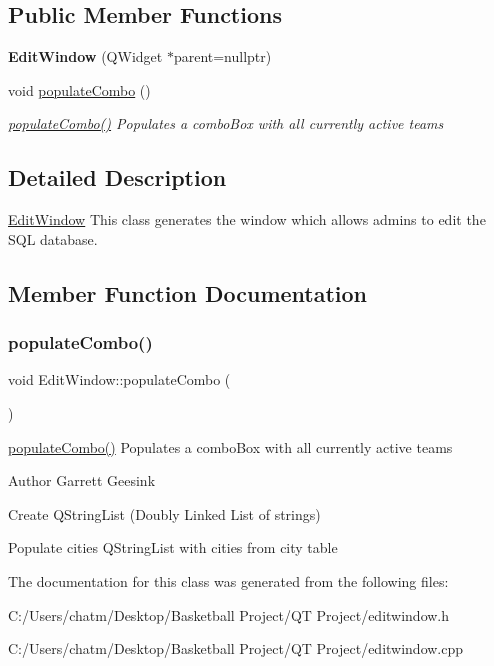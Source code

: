 \subsection*{Public Member Functions}
\begin{DoxyCompactItemize}
\item 
\mbox{\label{class_edit_window_a39a89944c117acac0419345f0a557528}} 
{\bfseries Edit\+Window} (Q\+Widget $\ast$parent=nullptr)
\item 
void \mbox{\hyperlink{class_edit_window_aec9c1fc6cf47cecb28a172b51fad2027}{populate\+Combo}} ()
\begin{DoxyCompactList}\small\item\em \mbox{\hyperlink{class_edit_window_aec9c1fc6cf47cecb28a172b51fad2027}{populate\+Combo()}} Populates a combo\+Box with all currently active teams \end{DoxyCompactList}\end{DoxyCompactItemize}


\subsection{Detailed Description}
\mbox{\hyperlink{class_edit_window}{Edit\+Window}} This class generates the window which allows admins to edit the S\+QL database. 

\subsection{Member Function Documentation}
\mbox{\label{class_edit_window_aec9c1fc6cf47cecb28a172b51fad2027}} 
\subsubsection{\texorpdfstring{populateCombo()}{populateCombo()}}
{\footnotesize\ttfamily void Edit\+Window\+::populate\+Combo (\begin{DoxyParamCaption}{ }\end{DoxyParamCaption})}



\mbox{\hyperlink{class_edit_window_aec9c1fc6cf47cecb28a172b51fad2027}{populate\+Combo()}} Populates a combo\+Box with all currently active teams 

\begin{DoxyAuthor}{Author}
Garrett Geesink 
\end{DoxyAuthor}
Create Q\+String\+List (Doubly Linked List of strings)

Populate cities Q\+String\+List with cities from city table 

The documentation for this class was generated from the following files\+:\begin{DoxyCompactItemize}
\item 
C\+:/\+Users/chatm/\+Desktop/\+Basketball Project/\+Q\+T Project/editwindow.\+h\item 
C\+:/\+Users/chatm/\+Desktop/\+Basketball Project/\+Q\+T Project/editwindow.\+cpp\end{DoxyCompactItemize}
